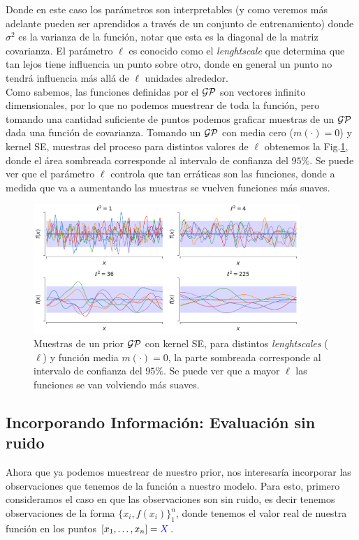 Donde en este caso los parámetros son interpretables (y como veremos más adelante pueden ser aprendidos a través de un conjunto de entrenamiento) donde $\sigma^2$ es la varianza de la función, notar que esta es la diagonal de la matriz covarianza. El parámetro $\ell$ es conocido como el \textit{lenghtscale} que determina que tan lejos tiene influencia un punto sobre otro, donde en general un punto no tendrá influencia más allá de $\ell$ unidades alrededor.\\

Como sabemos, las funciones definidas por el $\mathcal{GP}$ son vectores infinito dimensionales, por lo que no podemos muestrear de toda la función, pero tomando una cantidad suficiente de puntos podemos graficar muestras de un $\mathcal{GP}$ dada una función de covarianza. Tomando un $\mathcal{GP}$ con media cero ($m(\cdot)=0$) y kernel SE, muestras del proceso para distintos valores de $\ell$ obtenemos la Fig.\ref{fig:gp_1}, donde el área sombreada corresponde al intervalo de confianza del $95\%$. Se puede ver que el parámetro $\ell$ controla que tan erráticas son las funciones, donde a medida que va a aumentando las muestras se vuelven funciones más suaves.

\begin{figure}[H]
	\centering
	\includegraphics[width=0.9\textwidth]{img/cap6_gp_prior_muestras}
	\caption{Muestras de un prior $\mathcal{GP}$ con kernel SE, para distintos \textit{lenghtscales} ($\ell$) y función media $m(\cdot)=0$, la parte sombreada corresponde al intervalo de confianza del $95\%$. Se puede ver que a mayor $\ell$ las funciones se van volviendo más suaves.}
	\label{fig:gp_1}
\end{figure}

\subsection{Incorporando Información: Evaluación sin ruido}

Ahora que ya podemos muestrear de nuestro prior, nos interesaría incorporar las observaciones que tenemos de la función a nuestro modelo. Para esto, primero consideramos el caso en que las observaciones son sin ruido, es decir tenemos observaciones de la forma $\{x_i, f(x_i)\}_{1}^{n}$, donde tenemos el valor real de nuestra función en los puntos $[x_1, \ldots, x_n]=\textcolor{blue}{X}$. 

